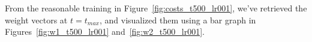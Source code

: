 From the reasonable training in Figure~\ref{fig:costs_t500_lr001}, we've retrieved the weight vectors at \(t = t_{max}\), and visualized them using a bar graph in Figures~\ref{fig:w1_t500_lr001} and~\ref{fig:w2_t500_lr001}.

